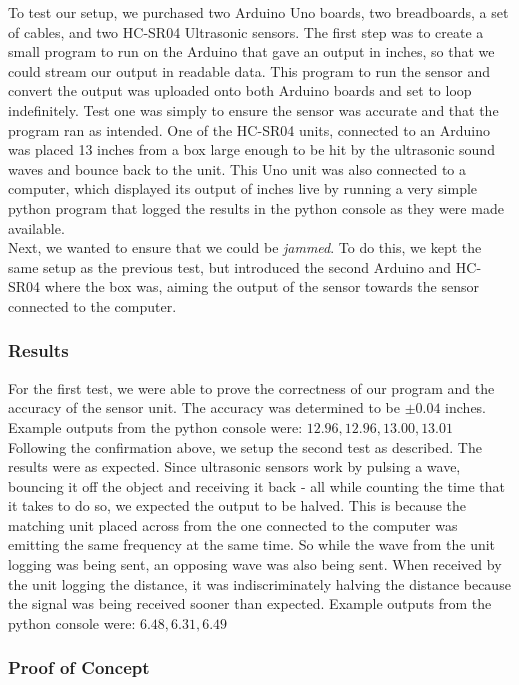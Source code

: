 \documentclass[conference]{IEEEtran}
\begin{document}
To test our setup, we purchased two Arduino Uno boards, two breadboards, a set of cables, and two HC-SR04 Ultrasonic sensors. The first step was to create a small program to run on the Arduino that gave an output in inches, so that we could stream our output in readable data. This program to run the sensor and convert the output was uploaded onto both Arduino boards and set to loop indefinitely. Test one was simply to ensure the sensor was accurate and that the program ran as intended. One of the HC-SR04 units, connected to an Arduino was placed 13 inches from a box large enough to be hit by the ultrasonic sound waves and bounce back to the unit. This Uno unit was also connected to a computer, which displayed its output of inches live by running a very simple python program that logged the results in the python console as they were made available.  \\
Next, we wanted to ensure that we could be \textit{jammed}. To do this, we kept the same setup as the previous test, but introduced the second Arduino and HC-SR04 where the box was, aiming the output of the sensor towards the sensor connected to the computer. 

\subsubsection{Results}

For the first test, we were able to prove the correctness of our program and the accuracy of the sensor unit. The accuracy was determined to be $\pm 0.04$ inches. Example outputs from the python console were: $12.96, 12.96, 13.00, 13.01$ \\
Following the confirmation above, we setup the second test as described. The results were as expected. Since ultrasonic sensors work by pulsing a wave, bouncing it off the object and receiving it back - all while counting the time that it takes to do so, we expected the output to be halved. This is because the matching unit placed across from the one connected to the computer was emitting the same frequency at the same time. So while the wave from the unit logging was being sent, an opposing wave was also being sent. When received by the unit logging the distance, it was indiscriminately halving the distance because the signal was being received sooner than expected. Example outputs from the python console were: $6.48, 6.31, 6.49$
\subsubsection{Proof of Concept}
\end{document}

